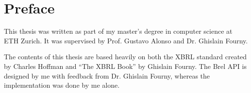 \section{Preface}

This thesis was written as part of my master's degree in computer science at ETH Zurich.
It was supervised by Prof. Gustavo Alonso and Dr. Ghislain Fourny.


The contents of this thesis are based heavily on both the XBRL standard\cite{xbrl} created by Charles Hoffman and ``The XBRL Book''\cite{fourny2023xbrl} by Ghislain Fourny.
The Brel API is designed by me with feedback from Dr. Ghislain Fourny,
whereas the implementation was done by me alone.